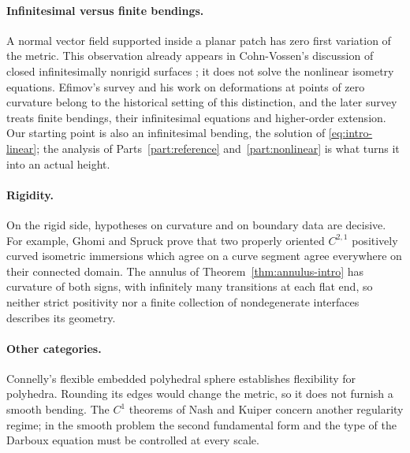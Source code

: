 \paragraph{Infinitesimal versus finite bendings.}
A normal vector field supported inside a planar patch has zero first
variation of the metric. This observation already appears in
Cohn-Vossen's discussion of closed infinitesimally nonrigid surfaces
\cite[footnote~2]{CohnVossen1930}; it does not solve the nonlinear
isometry equations. Efimov's survey \cite{Efimov1948Survey} and his
work on deformations at points of zero curvature
\cite{Efimov1948Zero} belong to the historical setting of this
distinction, and the later survey
\cite[Sections~1.1--1.4]{IvanovaSabitov1991} treats finite bendings,
their infinitesimal equations and higher-order extension. Our starting
point is also an infinitesimal bending, the solution of
\eqref{eq:intro-linear}; the analysis of
Parts~\ref{part:reference} and~\ref{part:nonlinear} is what turns it
into an actual height.

\paragraph{Rigidity.}
On the rigid side, hypotheses on curvature and on boundary data are
decisive. For example, Ghomi and Spruck
\cite[Theorem~1.1]{GhomiSpruck2020} prove that two properly oriented
$C^{2,1}$ positively curved isometric immersions which agree on a curve
segment agree everywhere on their connected domain. The annulus of
Theorem~\ref{thm:annulus-intro} has curvature of both signs, with
infinitely many transitions at each flat end, so neither strict
positivity nor a finite collection of nondegenerate interfaces
describes its geometry.

\paragraph{Other categories.}
Connelly's flexible embedded polyhedral sphere \cite{Connelly1977}
establishes flexibility for polyhedra. Rounding its edges would change
the metric, so it does not furnish a smooth bending. The $C^1$ theorems
of Nash and Kuiper \cite{Nash1954,Kuiper1955} concern another
regularity regime; in the smooth problem the second fundamental form
and the type of the Darboux equation must be controlled at every scale.

